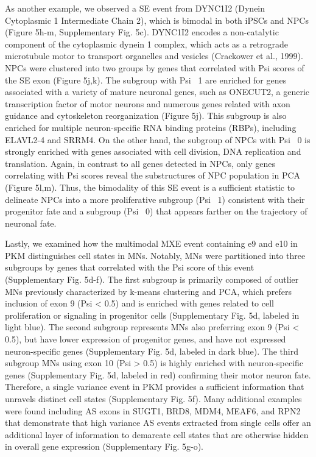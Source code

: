As another example, we observed a SE event from DYNC1I2 (Dynein Cytoplasmic 1 Intermediate Chain 2), which is bimodal in both iPSCs and NPCs (Figure 5h-m, Supplementary Fig. 5c). DYNC1I2 encodes a non-catalytic component of the cytoplasmic dynein 1 complex, which acts as a retrograde microtubule motor to transport organelles and vesicles (Crackower et al., 1999). NPCs were clustered into two groups by genes that correlated with Psi scores of the SE exon (Figure 5j,k). The subgroup with Psi ~1 are enriched for genes associated with a variety of mature neuronal genes, such as ONECUT2, a generic transcription factor of motor neurons and numerous genes related with axon guidance and cytoskeleton reorganization (Figure 5j). This subgroup is also enriched for multiple neuron-specific RNA binding proteins (RBPs), including ELAVL2-4 and SRRM4. On the other hand, the subgroup of NPCs with Psi ~0 is strongly enriched with genes associated with cell division, DNA replication and translation. Again, in contrast to all genes detected in NPCs, only genes correlating with Psi scores reveal the substructures of NPC population in PCA (Figure 5l,m). Thus, the bimodality of this SE event is a sufficient statistic to delineate NPCs into a more proliferative subgroup (Psi ~1) consistent with their progenitor fate and a subgroup (Psi ~0) that appears farther on the trajectory of neuronal fate. 

Lastly, we examined how the multimodal MXE event containing e9 and e10 in PKM distinguishes cell states in MNs. Notably, MNs were partitioned into three subgroups by genes that correlated with the Psi score of this event (Supplementary Fig. 5d-f). The first subgroup is primarily composed of outlier MNs previously characterized by k-means clustering and PCA, which prefers inclusion of exon 9 (Psi < 0.5) and is enriched with genes related to cell proliferation or signaling in progenitor cells (Supplementary Fig. 5d, labeled in light blue). The second subgroup represents MNs also preferring exon 9 (Psi < 0.5), but have lower expression of progenitor genes, and have not expressed neuron-specific genes (Supplementary Fig. 5d, labeled in dark blue). The third subgroup MNs using exon 10 (Psi > 0.5) is highly enriched with neuron-specific genes (Supplementary Fig. 5d, labeled in red) confirming their motor neuron fate. Therefore, a single variance event in PKM provides a sufficient information that unravels distinct cell states (Supplementary Fig. 5f). Many additional examples were found including AS exons in SUGT1, BRD8, MDM4, MEAF6, and RPN2 that demonstrate that high variance AS events extracted from single cells offer an additional layer of information to demarcate cell states that are otherwise hidden in overall gene expression (Supplementary Fig. 5g-o). 

